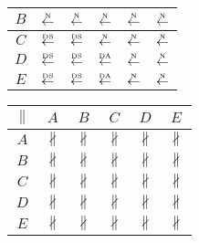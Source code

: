 \begin{table}[htbp]
\begin{subtable}{1\textwidth}
\begin{minipage}[b]{0.3\textwidth}
\begin{tabular}{|c|c|c|c|c|c|}
        $B$ & $\overset{\text{\tiny{N}}}{\leftarrow}$ & $\overset{\text{\tiny{N}}}{\leftarrow}$ & $\overset{\text{\tiny{N}}}{\leftarrow}$ & $\overset{\text{\tiny{N}}}{\leftarrow}$ & $\overset{\text{\tiny{N}}}{\leftarrow}$\\ \hline
        $C$ & $\overset{\text{\tiny{DS}}}{\leftarrow}$ & $\overset{\text{\tiny{DS}}}{\leftarrow}$ & $\overset{\text{\tiny{N}}}{\leftarrow}$ & $\overset{\text{\tiny{N}}}{\leftarrow}$ & $\overset{\text{\tiny{N}}}{\leftarrow}$\\ \hline
        $D$ & \cellcolor{lightgray}$\overset{\text{\tiny{DS}}}{\leftarrow}$ & \cellcolor{lightgray}$\overset{\text{\tiny{DS}}}{\leftarrow}$ & $\overset{\text{\tiny{DA}}}{\leftarrow}$ & $\overset{\text{\tiny{N}}}{\leftarrow}$ & $\overset{\text{\tiny{N}}}{\leftarrow}$\\ \hline
        $E$ & \cellcolor{lightgray}\cellcolor{lightgray}$\overset{\text{\tiny{DS}}}{\leftarrow}$ & \cellcolor{lightgray}$\overset{\text{\tiny{DS}}}{\leftarrow}$ & $\overset{\text{\tiny{DA}}}{\leftarrow}$ & $\overset{\text{\tiny{N}}}{\leftarrow}$ & $\overset{\text{\tiny{N}}}{\leftarrow}$\\ \hline
      \end{tabular}
    \end{minipage}
    \begin{minipage}[b]{0.3\textwidth}
      \centering
      \begin{tabular}{|c|c|c|c|c|c|} \hline
        $\parallel$ & $A$ & $B$ & $C$ & $D$ & $E$\\ \hline
        $A$ & $\nparallel$ & $\nparallel$ & $\nparallel$ & $\nparallel$ & $\nparallel$\\ \hline
        $B$ & $\nparallel$ & $\nparallel$ & $\nparallel$ & $\nparallel$ & $\nparallel$\\ \hline
        $C$ & $\nparallel$ & $\nparallel$ & $\nparallel$ & $\nparallel$ & $\nparallel$\\ \hline
        $D$ & $\nparallel$ & $\nparallel$ & $\nparallel$ & $\nparallel$ & $\nparallel$\\ \hline
        $E$ & $\nparallel$ & $\nparallel$ & $\nparallel$ & $\nparallel$ & $\nparallel$\\ \hline
      \end{tabular}
    \end{minipage}
  \end{subtable}
\end{table}

